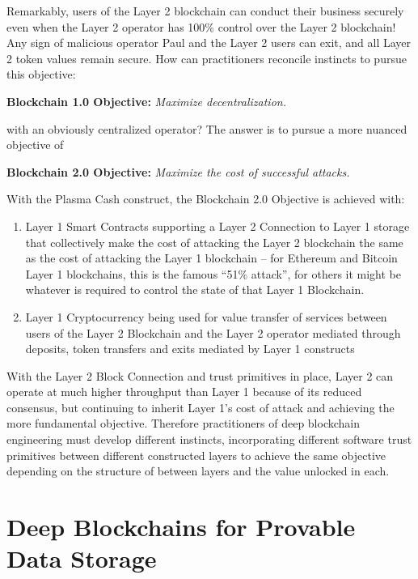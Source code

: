 \documentclass{article}
\begin{document}
Remarkably, users of the Layer 2 blockchain can conduct their business securely even when the Layer 2 operator has 100\% control over the Layer 2 blockchain!  Any sign of malicious operator Paul and the Layer 2 users can exit, and all Layer 2 token values remain secure.  How can practitioners reconcile instincts to pursue this objective:

\begin{center}
   {\bf Blockchain 1.0 Objective:} {\em Maximize decentralization.}
\end{center}

\noindent with an obviously centralized operator?   The answer is to pursue a more nuanced objective of

\begin{center}
   {\bf Blockchain 2.0 Objective:} {\em Maximize the cost of successful attacks.}
\end{center}

With the Plasma Cash construct, the Blockchain 2.0 Objective is achieved with:
\begin{enumerate}
    \item Layer 1 Smart Contracts supporting a Layer 2 Connection to Layer 1 storage that collectively make the cost of attacking the Layer 2 blockchain the same as the cost of attacking the Layer 1 blockchain -- for Ethereum and Bitcoin Layer 1 blockchains, this is the famous ``51\% attack'', for others it might be whatever is required to control the state of that Layer 1 Blockchain.  
    \item Layer 1 Cryptocurrency being used for value transfer of services between users of the Layer 2 Blockchain and the Layer 2 operator mediated through deposits, token transfers and exits mediated by Layer 1 constructs
\end{enumerate}  
With the Layer 2 Block Connection and trust primitives in place, Layer 2 can operate at much higher throughput than Layer 1 because of its reduced consensus, but continuing to inherit Layer 1's cost of attack and achieving the more fundamental objective.  Therefore practitioners of deep blockchain engineering must develop different instincts, incorporating different software trust primitives between different constructed layers to achieve the same objective depending on the structure of between layers and the value unlocked in each.  

\section{Deep Blockchains for Provable Data Storage}
\end{document}
